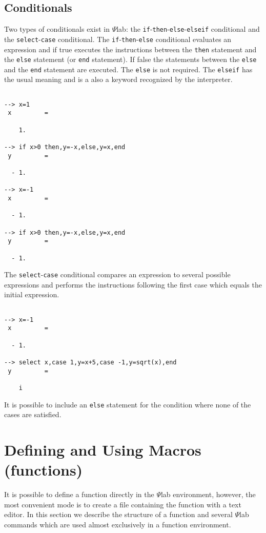 \subsection{Conditionals}
Two types of conditionals exist in $\Psi$lab: the 
{\tt if}-{\tt then}-{\tt else}-{\tt elseif}
conditional and the 
{\tt select}-{\tt case} 
conditional.  The 
{\tt if}-{\tt then}-{\tt else} conditional
evaluates an expression and if true executes the
instructions between the {\tt then} statement and the {\tt else} statement
(or {\tt end} statement).
If false the statements between the {\tt else} and the {\tt end}
statement are executed.  The {\tt else} is not required. The {\tt elseif}
has the usual meaning and is a also a keyword recognized by the interpreter.
\begin{verbatim}
 
--> x=1
 x         =
 
    1.  
 
--> if x>0 then,y=-x,else,y=x,end
 y         =
 
  - 1.  
 
--> x=-1
 x         =
 
  - 1.  
 
--> if x>0 then,y=-x,else,y=x,end
 y         =
 
  - 1.  
\end{verbatim}


	The {\tt select}-{\tt case} conditional
compares an expression to several possible expressions and performs the
instructions following the first case which equals the initial expression.
\begin{verbatim}
 
--> x=-1
 x         =
 
  - 1.  
 
--> select x,case 1,y=x+5,case -1,y=sqrt(x),end
 y         =
 
    i    
\end{verbatim}
It is possible to include an {\tt else} statement for the condition
where none of the cases are satisfied.

\section{Defining and Using Macros (functions)}
\label{s4.2}

	It is possible to define a function directly in
the $\Psi$lab environment, however, the most convenient mode
is to create a file containing the function
with a text editor.  In this section we describe the
structure of a function and several $\Psi$lab commands which are
used almost exclusively in a function environment.

